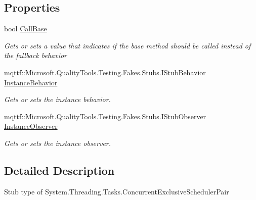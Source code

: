 \subsection*{Properties}
\begin{DoxyCompactItemize}
\item 
bool \hyperlink{class_system_1_1_threading_1_1_tasks_1_1_fakes_1_1_stub_concurrent_exclusive_scheduler_pair_adecb3e7aeb5a7808f4c5c0502d119a37}{Call\-Base}
\begin{DoxyCompactList}\small\item\em Gets or sets a value that indicates if the base method should be called instead of the fallback behavior\end{DoxyCompactList}\item 
mqttf\-::\-Microsoft.\-Quality\-Tools.\-Testing.\-Fakes.\-Stubs.\-I\-Stub\-Behavior \hyperlink{class_system_1_1_threading_1_1_tasks_1_1_fakes_1_1_stub_concurrent_exclusive_scheduler_pair_ada1f9b4ffd5db3e0cb41cf4635faf4d0}{Instance\-Behavior}
\begin{DoxyCompactList}\small\item\em Gets or sets the instance behavior.\end{DoxyCompactList}\item 
mqttf\-::\-Microsoft.\-Quality\-Tools.\-Testing.\-Fakes.\-Stubs.\-I\-Stub\-Observer \hyperlink{class_system_1_1_threading_1_1_tasks_1_1_fakes_1_1_stub_concurrent_exclusive_scheduler_pair_aa3e4f6a0f8c49c661ee3b35c4cb3a322}{Instance\-Observer}
\begin{DoxyCompactList}\small\item\em Gets or sets the instance observer.\end{DoxyCompactList}\end{DoxyCompactItemize}


\subsection{Detailed Description}
Stub type of System.\-Threading.\-Tasks.\-Concurrent\-Exclusive\-Scheduler\-Pair



